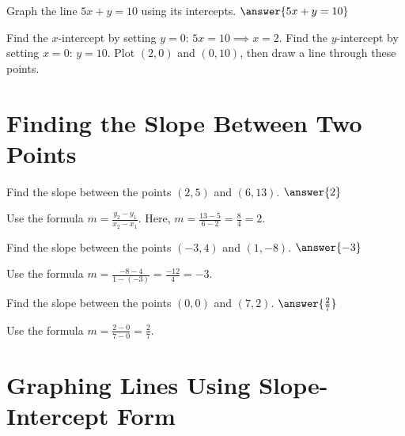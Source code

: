 \documentclass{ximera}
\begin{document}
\begin{problem}
Graph the line $5x + y = 10$ using its intercepts. $\answer{5x + y = 10}$
\begin{feedback}
Find the $x$-intercept by setting $y = 0$: $5x = 10 \implies x = 2$. Find the $y$-intercept by setting $x = 0$: $y = 10$. Plot $(2, 0)$ and $(0, 10)$, then draw a line through these points.
\end{feedback}
\end{problem}



\section*{Finding the Slope Between Two Points}

\begin{problem}
Find the slope between the points $(2, 5)$ and $(6, 13)$. $\answer{2}$
\begin{feedback}
Use the formula $m = \frac{y_2 - y_1}{x_2 - x_1}$. Here, $m = \frac{13 - 5}{6 - 2} = \frac{8}{4} = 2$.
\end{feedback}
\end{problem}

\begin{problem}
Find the slope between the points $(-3, 4)$ and $(1, -8)$. $\answer{-3}$
\begin{feedback}
Use the formula $m = \frac{-8 - 4}{1 - (-3)} = \frac{-12}{4} = -3$.
\end{feedback}
\end{problem}

\begin{problem}
Find the slope between the points $(0, 0)$ and $(7, 2)$. $\answer{\frac{2}{7}}$
\begin{feedback}
Use the formula $m = \frac{2 - 0}{7 - 0} = \frac{2}{7}$.
\end{feedback}
\end{problem}



\section*{Graphing Lines Using Slope-Intercept Form}
\end{document}
